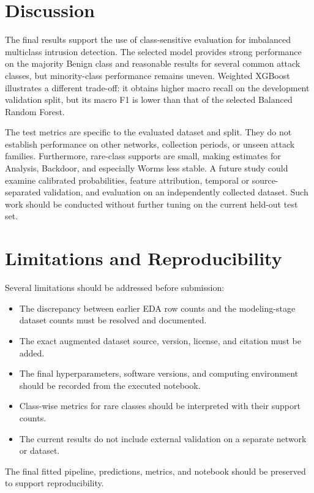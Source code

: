 \documentclass[conference]{IEEEtran}
\begin{document}

\section{Discussion}
The final results support the use of class-sensitive evaluation for imbalanced multiclass intrusion detection. The selected model provides strong performance on the majority Benign class and reasonable results for several common attack classes, but minority-class performance remains uneven. Weighted XGBoost illustrates a different trade-off: it obtains higher macro recall on the development validation split, but its macro F1 is lower than that of the selected Balanced Random Forest.

The test metrics are specific to the evaluated dataset and split. They do not establish performance on other networks, collection periods, or unseen attack families. Furthermore, rare-class supports are small, making estimates for Analysis, Backdoor, and especially Worms less stable. A future study could examine calibrated probabilities, feature attribution, temporal or source-separated validation, and evaluation on an independently collected dataset. Such work should be conducted without further tuning on the current held-out test set.

\section{Limitations and Reproducibility}
Several limitations should be addressed before submission:
\begin{itemize}
    \item The discrepancy between earlier EDA row counts and the modeling-stage dataset counts must be resolved and documented.
    \item The exact augmented dataset source, version, license, and citation must be added.
    \item The final hyperparameters, software versions, and computing environment should be recorded from the executed notebook.
    \item Class-wise metrics for rare classes should be interpreted with their support counts.
    \item The current results do not include external validation on a separate network or dataset.
\end{itemize}
The final fitted pipeline, predictions, metrics, and notebook should be preserved to support reproducibility.
\end{document}
